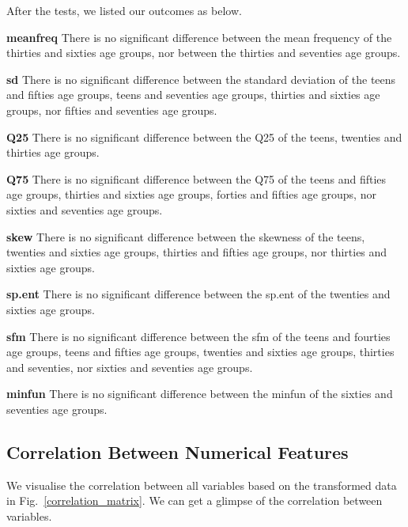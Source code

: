 \documentclass{article}
\begin{document}
	After the tests, we listed our outcomes as below.
	
	\textbf{meanfreq} There is no significant difference between the mean frequency of the thirties and sixties age groups, nor between the thirties and seventies age groups.
	
	\textbf{sd} There is no significant difference between the standard deviation of the teens and fifties age groups, teens and seventies age groups, thirties and sixties age groups, nor fifties and seventies age groups.
	
	\textbf{Q25} There is no significant difference between the Q25 of the teens, twenties and thirties age groups.
	
	\textbf{Q75} There is no significant difference between the Q75 of the teens and fifties age groups, thirties and sixties age groups, forties and fifties age groups, nor sixties and seventies age groups.
	
	\textbf{skew} There is no significant difference between the skewness of the teens, twenties and sixties age groups, thirties and fifties age groups, nor thirties and sixties age groups.
	
	\textbf{sp.ent} There is no significant difference between the sp.ent of the twenties and sixties age groups.
	
	\textbf{sfm} There is no significant difference between the sfm of the teens and fourties age groups, teens and fifties age groups, twenties and sixties age groups, thirties and seventies, nor sixties and seventies age groups.
	
	\textbf{minfun} There is no significant difference between the minfun of the sixties and seventies age groups.	
	
	\subsection{Correlation Between Numerical Features}
	
	We visualise the correlation between all variables based on the transformed data in Fig.~\ref{correlation_matrix}. We can get a glimpse of the correlation between variables.
	
\end{document}

